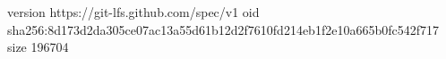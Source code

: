version https://git-lfs.github.com/spec/v1
oid sha256:8d173d2da305ce07ac13a55d61b12d2f7610fd214eb1f2e10a665b0fc542f717
size 196704
